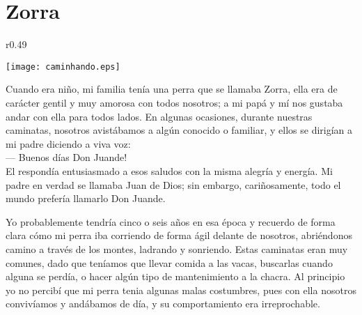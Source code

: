 \cleardoublepage
\newpage
\ifdefined\EnableIncludeImages
\fi
\chapter{Zorra}


\ifdefined\EnableIncludeImages
\begin{wrapfigure}{r}{0.49\textwidth}
  \begin{center}
  \vspace{-30pt}
    \texttt{[image: caminhando.eps]}
  \end{center}
  \vspace{-20pt}
\end{wrapfigure}
\fi
Cuando era niño, mi familia tenía una perra que se llamaba Zorra, ella era de carácter gentil y muy amorosa con todos nosotros; a mi papá y mí nos gustaba andar con ella para todos lados. En algunas ocasiones, durante nuestras caminatas, nosotros avistábamos a algún conocido o familiar, y ellos se dirigían a mi padre diciendo a viva voz:\\\indent
--- Buenos días Don Juande!\\\indent
El respondía entusiasmado a esos saludos con la misma alegría y energía.
Mi padre en verdad se llamaba Juan de Dios; sin embargo, cariñosamente, todo el mundo prefería llamarlo Don Juande.

Yo probablemente tendría cinco o seis años en esa época y recuerdo de forma clara cómo mi perra iba corriendo de forma ágil delante de nosotros, abriéndonos camino a través de los montes, ladrando y sonriendo.
Estas caminatas eran muy comunes, dado que teníamos que llevar comida a las vacas, buscarlas cuando alguna se perdía, o hacer algún tipo de mantenimiento a la chacra.
Al principio yo no percibí que mi perra tenia algunas malas costumbres, pues con ella nosotros convivíamos y andábamos de día, y su comportamiento era irreprochable.

